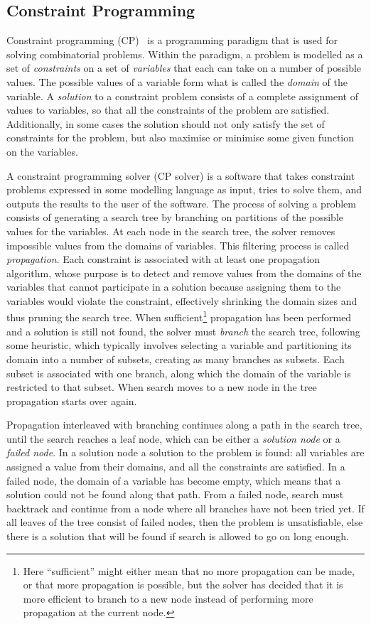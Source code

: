 \documentclass[a4paper,11pt]{article}
\numberwithin{equation}{section}
\begin{document}
\subsection{Constraint Programming}
\label{bg:cp}
Constraint programming (CP)~\cite{Apt:constraintsBook}
is a programming paradigm that is used for solving
combinatorial problems. Within the paradigm, a problem is
modelled as a set of \emph{constraints} on a
set of \emph{variables} that each can take on a number of
possible values. The possible values of 
a variable form what is called the \emph{domain} of the variable.
A \emph{solution} to a constraint problem consists of a complete assignment
of values to variables, so that all the constraints of the problem
are satisfied. Additionally, in some cases the solution should not only
satisfy the set of constraints for the
problem, but also maximise or minimise some given function on the variables.

A constraint programming solver (CP solver) is a software that
takes constraint problems expressed in some modelling language as input,
tries to solve them, and outputs the results to the user of the software.
The process of solving a problem consists of generating a search tree by branching
on partitions of the possible values for the variables. 
At each node in the search tree,
the solver removes impossible values from the domains of variables.
This filtering process is called \emph{propagation}. Each constraint is
associated with at least one propagation algorithm, whose purpose is to detect
and remove values from the domains of the variables
that cannot participate in a solution because assigning them to
the variables would violate the constraint,
effectively shrinking the domain sizes and thus 
pruning the search tree.
When sufficient\footnote{Here ``sufficient'' might either mean that no more
  propagation can be made, or that more propagation is possible,
  but the solver has decided that it is more efficient to branch to a new node instead of 
  performing more propagation at the current node.}
propagation has been performed and a solution is still not found,
the solver must \emph{branch} the search tree, following some heuristic,
which typically involves selecting a variable and partitioning its domain 
into a number of subsets, creating as many branches as subsets.
Each subset is associated with one branch, along which the domain
of the variable is restricted to that subset.
When search moves to a new node in the tree propagation starts over again.

Propagation interleaved with branching continues along a path in the search tree,
until the search reaches a leaf node, which can be either a
\emph{solution node} or a \emph{failed node}.
In a solution node a solution to the problem is found:
all variables are assigned a value
from their domains, and all the constraints are satisfied.
In a failed node, the domain of a variable has become empty, which
means that a solution could not be found along that path.
From a failed node, search must backtrack and continue from a node where all branches
have not been tried yet. If all leaves of the tree consist of failed nodes, then
the problem is unsatisfiable, else there is a solution that will be
found if search is allowed to go on long enough.
\end{document}
